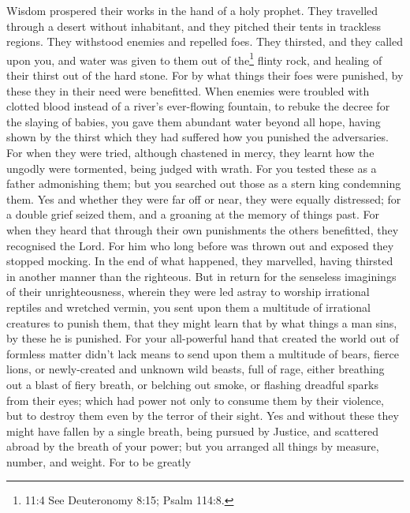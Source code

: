  Wisdom prospered their works in the hand of a holy prophet.
 They travelled through a desert without inhabitant, and
they pitched their tents in trackless regions.  They
withstood enemies and repelled foes.  They thirsted, and
they called upon you, and water was given to them out of the\footnote{11:4
  See Deuteronomy 8:15; Psalm 114:8.} flinty rock, and healing of their
thirst out of the hard stone.  For by what things their foes
were punished, by these they in their need were benefitted. 
When enemies were troubled with clotted blood instead of a river's
ever-flowing fountain,  to rebuke the decree for the slaying
of babies, you gave them abundant water beyond all hope, 
having shown by the thirst which they had suffered how you punished the
adversaries.  For when they were tried, although chastened
in mercy, they learnt how the ungodly were tormented, being judged with
wrath.  For you tested these as a father admonishing them;
but you searched out those as a stern king condemning them.
 Yes and whether they were far off or near, they were
equally distressed;  for a double grief seized them, and a
groaning at the memory of things past.  For when they heard
that through their own punishments the others benefitted, they
recognised the Lord.  For him who long before was thrown
out and exposed they stopped mocking. In the end of what happened, they
marvelled, having thirsted in another manner than the righteous.
 But in return for the senseless imaginings of their
unrighteousness, wherein they were led astray to worship irrational
reptiles and wretched vermin, you sent upon them a multitude of
irrational creatures to punish them,  that they might learn
that by what things a man sins, by these he is punished. 
For your all-powerful hand that created the world out of formless matter
didn't lack means to send upon them a multitude of bears, fierce lions,
 or newly-created and unknown wild beasts, full of rage,
either breathing out a blast of fiery breath, or belching out smoke, or
flashing dreadful sparks from their eyes;  which had power
not only to consume them by their violence, but to destroy them even by
the terror of their sight.  Yes and without these they
might have fallen by a single breath, being pursued by Justice, and
scattered abroad by the breath of your power; but you arranged all
things by measure, number, and weight.  For to be greatly
